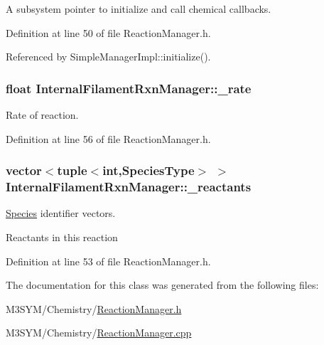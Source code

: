 A subsystem pointer to initialize and call chemical callbacks. 



Definition at line 50 of file Reaction\+Manager.\+h.



Referenced by Simple\+Manager\+Impl\+::initialize().

\hypertarget{classInternalFilamentRxnManager_a8b98dd9e6f5d016149f5434b891806df}{
\subsubsection[{\+\_\+rate}]{\setlength{\rightskip}{0pt plus 5cm}float Internal\+Filament\+Rxn\+Manager\+::\+\_\+rate\hspace{0.3cm}{\ttfamily [protected]}}}\label{classInternalFilamentRxnManager_a8b98dd9e6f5d016149f5434b891806df}


Rate of reaction. 



Definition at line 56 of file Reaction\+Manager.\+h.

\hypertarget{classInternalFilamentRxnManager_a63de9061c3da4ad03cf4c530d2774979}{
\subsubsection[{\+\_\+reactants}]{\setlength{\rightskip}{0pt plus 5cm}vector$<$tuple$<$int,{\bf Species\+Type}$>$ $>$ Internal\+Filament\+Rxn\+Manager\+::\+\_\+reactants\hspace{0.3cm}{\ttfamily [protected]}}}\label{classInternalFilamentRxnManager_a63de9061c3da4ad03cf4c530d2774979}


\hyperlink{classSpecies}{Species} identifier vectors. 

Reactants in this reaction 

Definition at line 53 of file Reaction\+Manager.\+h.



The documentation for this class was generated from the following files\+:\begin{DoxyCompactItemize}
\item 
M3\+S\+Y\+M/\+Chemistry/\hyperlink{ReactionManager_8h}{Reaction\+Manager.\+h}\item 
M3\+S\+Y\+M/\+Chemistry/\hyperlink{ReactionManager_8cpp}{Reaction\+Manager.\+cpp}\end{DoxyCompactItemize}
